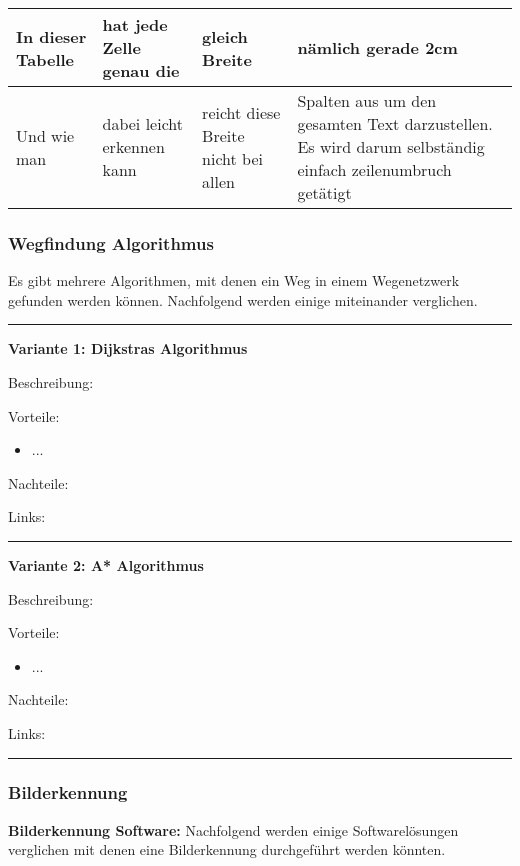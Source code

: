 \begin{tabularx}{\textwidth}{|X|X|X|X|}
\hline
In dieser Tabelle & hat jede Zelle genau die & gleich Breite & nämlich gerade 2cm \\
\hline
Und wie man & dabei leicht erkennen kann & reicht diese Breite nicht bei allen
& Spalten aus um den gesamten Text darzustellen. Es wird darum selbständig einfach zeilenumbruch getätigt \\
\hline
\end{tabularx}

\subsubsection{Wegfindung Algorithmus}

Es gibt mehrere Algorithmen, mit denen ein Weg in einem Wegenetzwerk gefunden werden können. Nachfolgend werden einige miteinander verglichen.

\vspace{10pt}
\hrule

\textbf{Variante 1: Dijkstras Algorithmus}

Beschreibung:

Vorteile:
\begin{itemize}
    \item ...
\end{itemize}

Nachteile:

Links:

\vspace{5pt}
\hrule

\textbf{Variante 2: A* Algorithmus}

Beschreibung:

Vorteile:
\begin{itemize}
    \item ...
\end{itemize}

Nachteile:

Links:

\vspace{5pt}
\hrule




\subsubsection{Bilderkennung}

\textbf{Bilderkennung Software:} Nachfolgend werden einige Softwarelösungen verglichen mit denen eine Bilderkennung durchgeführt werden könnten.

